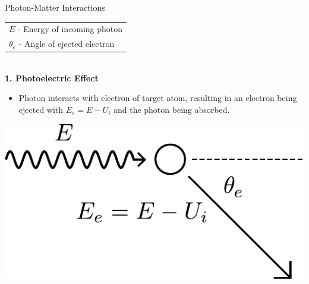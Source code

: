 \documentclass[final]{beamer}
\newlength{\colwidth}
\begin{document}
\begin{frame}[t]
\begin{columns}[t]
\begin{column}{\colwidth}
\begin{block}{Photon-Matter Interactions}
  \begin{multicols}{2}
      \begin{center}
          \begin{tabular}{@{\extracolsep{\fill}}l}
            $E$ - Energy of incoming photon\\
            $\theta_e$ - Angle of ejected electron\\
          \end{tabular}
          \vspace{\baselineskip} \\
          \textbf{1. Photoelectric Effect}
          \begin{itemize}
              \item Photon interacts with electron of target atom, resulting in an electron being ejected with $E_e = E - U_i$ and the photon being absorbed.
          \end{itemize}
      \end{center}
      \vfill
      \begin{center}
          \includegraphics[width=0.8\linewidth]{photoelectric_diagram.pdf} %
      \end{center}
      \vspace{-0.25\baselineskip}
  
      \columnbreak%
  

\end{multicols}
\end{block}
\end{column}
\end{columns}
\end{frame}
\end{document}
